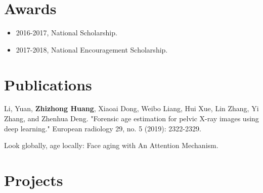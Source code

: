 \documentclass{article}
\begin{document}
    \section*{Awards}
        \begin{itemize}[leftmargin=*]
            \setlength{\itemsep}{0pt}
            \setlength{\parsep}{0pt}
            \setlength{\parskip}{0pt}
            \item \begin{flushleft}2016-2017, National Scholarship.\end{flushleft}
            \item \begin{flushleft}2017-2018, National Encouragement Scholarship.\end{flushleft}
        \end{itemize}
    \section*{Publications}
        \begin{enumerate}[label={[\arabic*]},leftmargin=*]
            \setlength{\itemsep}{0pt}
            \setlength{\parsep}{0pt}
            \setlength{\parskip}{0pt}
            \item Li, Yuan, \textbf{Zhizhong Huang}, Xiaoai Dong, Weibo Liang, Hui Xue, Lin Zhang, Yi Zhang, and Zhenhua Deng. "Forensic age estimation for pelvic X-ray images using deep learning." European radiology 29, no. 5 (2019): 2322-2329.
            \item Look globally, age locally: Face aging with An Attention Mechanism.
        \end{enumerate}
    \section*{Projects}
\end{document}
